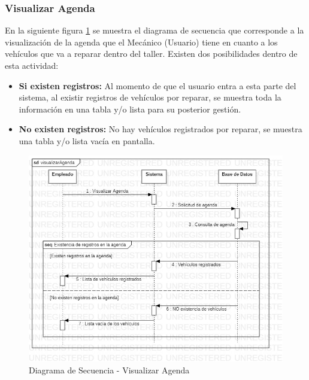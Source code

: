 \subsubsection{Visualizar Agenda}
En la siguiente figura \ref{fig:Diagrama de Secuencia - Visualizar Agenda} se muestra el diagrama de secuencia que corresponde a la visualización de la agenda que el Mecánico (Usuario) tiene en cuanto a los vehículos que va a reparar dentro del taller. Existen dos posibilidades dentro de esta actividad:
\begin{itemize}
	\item \textbf{Si existen registros:} Al momento de que el usuario entra a esta parte del sistema, al existir registros de vehículos por reparar, se muestra toda la información en una tabla y/o lista para su posterior gestión.  
	\item \textbf{No existen registros:} No hay vehículos registrados por reparar, se muestra una tabla y/o lista vacía en pantalla.
\end{itemize}
\begin{figure}[!h]
	\centering
	\includegraphics[width=1\textwidth]{./diseno/vprocesos/imagenes/visualizarAgenda}
	\caption{Diagrama de Secuencia - Visualizar Agenda}
	\label{fig:Diagrama de Secuencia - Visualizar Agenda}
\end{figure}